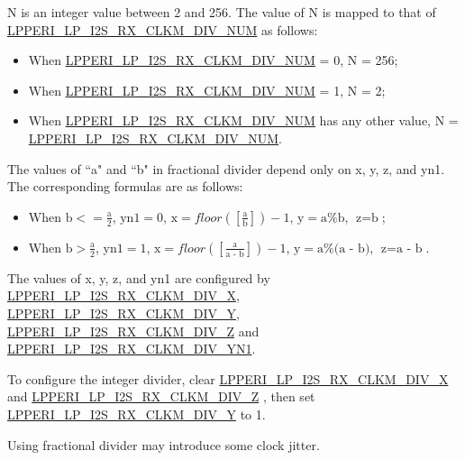 \documentclass[main\_\_EN.tex]{subfiles}
\begin{document}
N is an integer value between 2 and 256. The value of N is mapped to that of \hyperref[fielddesc:LPPERILPI2SRXCLKMDIVNUM]{LPPERI\_LP\_I2S\_RX\_CLKM\_DIV\_NUM} as follows:

\begin{itemize}
    \item When \hyperref[fielddesc:LPPERILPI2SRXCLKMDIVNUM]{LPPERI\_LP\_I2S\_RX\_CLKM\_DIV\_NUM} = 0, N = 256;
    \item When \hyperref[fielddesc:LPPERILPI2SRXCLKMDIVNUM]{LPPERI\_LP\_I2S\_RX\_CLKM\_DIV\_NUM} = 1, N = 2;
    \item When \hyperref[fielddesc:LPPERILPI2SRXCLKMDIVNUM]{LPPERI\_LP\_I2S\_RX\_CLKM\_DIV\_NUM} has any other value, N =  \hyperref[fielddesc:LPPERILPI2SRXCLKMDIVNUM]{LPPERI\_LP\_I2S\_RX\_CLKM\_DIV\_NUM}.
\end{itemize}

The values of ``a" and ``b" in fractional divider depend only on x, y, z, and yn1. The corresponding formulas are as follows:

\begin{itemize}
    \item When $\textrm{b} <= \frac{\textrm{a}}{2}$, $\textrm{yn1} = 0$, $\textrm{x} = floor([\frac{\textrm{a}}{\textrm{b}}]) - 1$, $\textrm{y} = \textrm{a}\%\textrm{b}$, $\textrm{z} = \textrm{b}$; 
    \item When $\textrm{b} > \frac{\textrm{a}}{2}$, $\textrm{yn1}=1$, $\textrm{x} = floor([\frac{\textrm{a}}{\textrm{a - b}}]) - 1$, $\textrm{y} = \textrm{a}\%\textrm{(a - b)}$, $\textrm{z}=\textrm{a - b}$.
\end{itemize}

The values of x, y, z, and yn1 are configured by  \hyperref[fielddesc:LPPERILPI2SRXCLKMDIVX]{LPPERI\_LP\_I2S\_RX\_CLKM\_DIV\_X}, \hyperref[fielddesc:LPPERILPI2SRXCLKMDIVY]{LPPERI\_LP\_I2S\_RX\_CLKM\_DIV\_Y}, \hyperref[fielddesc:LPPERILPI2SRXCLKMDIVZ]{LPPERI\_LP\_I2S\_RX\_CLKM\_DIV\_Z} and \hyperref[fielddesc:LPPERILPI2SRXCLKMDIVYN1]{LPPERI\_LP\_I2S\_RX\_CLKM\_DIV\_YN1}.

To configure the integer divider, clear \hyperref[fielddesc:LPPERILPI2SRXCLKMDIVX]{LPPERI\_LP\_I2S\_RX\_CLKM\_DIV\_X} and \hyperref[fielddesc:LPPERILPI2SRXCLKMDIVZ]{LPPERI\_LP\_I2S\_RX\_CLKM\_DIV\_Z} , then set \hyperref[fielddesc:LPPERILPI2SRXCLKMDIVY]{LPPERI\_LP\_I2S\_RX\_CLKM\_DIV\_Y} to 1.

\begin{tiplisting}
Using fractional divider may introduce some clock jitter.
\end{tiplisting}
\end{document}
